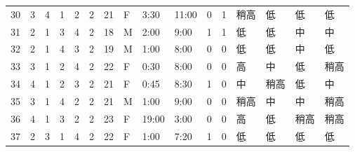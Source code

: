 \begin{table}[htbp]
{\begin{tabular}{llllllllllllllll}
30                  & 3                    & 4                    & 1                    & 2                    & 2                  & 21                     & F                   & 3:30                  & 11:00                 & 0                    & 1                    & 稍高    & 低     & 低     & 低     \\
31                  & 2                    & 1                    & 3                    & 4                    & 2                  & 18                     & M                   & 2:00                  & 9:00                  & 1                    & 1                    & 低     & 低     & 中     & 中     \\
32                  & 2                    & 1                    & 4                    & 3                    & 2                  & 19                     & M                   & 1:00                  & 8:00                  & 0                    & 0                    & 低     & 低     & 中     & 低     \\
33                  & 3                    & 1                    & 2                    & 4                    & 2                  & 22                     & F                   & 0:30                  & 8:00                  & 0                    & 0                    & 高     & 中     & 低     & 稍高    \\
34                  & 4                    & 1                    & 2                    & 3                    & 2                  & 21                     & F                   & 0:45                  & 8:30                  & 1                    & 0                    & 中     & 稍高    & 低     & 中     \\
35                  & 3                    & 1                    & 4                    & 2                    & 2                  & 21                     & M                   & 1:00                  & 9:00                  & 0                    & 0                    & 稍高    & 中     & 中     & 稍高    \\
36                  & 4                    & 1                    & 3                    & 2                    & 2                  & 23                     & F                   & 19:00                 & 3:00                  & 0                    & 0                    & 高     & 低     & 稍高    & 稍高    \\
37                  & 2                    & 3                    & 1                    & 4                    & 2                  & 22                     & F                   & 1:00                  & 7:20                  & 1                    & 0                    & 低     & 低     & 低     & 低     \\

\end{tabular}}
\end{table}
